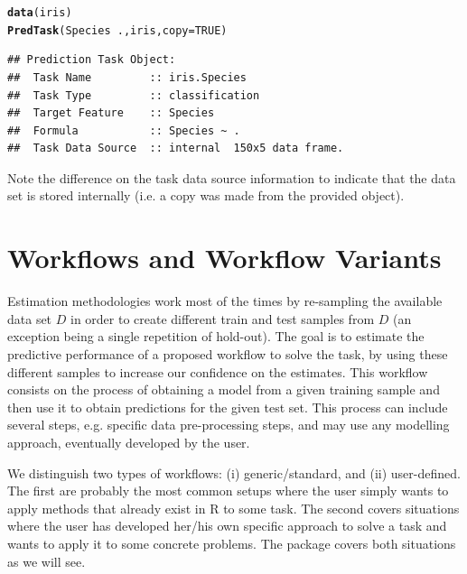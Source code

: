 \documentclass[10pt,a4paper]{article}\usepackage[]{graphicx}\usepackage[]{color}
\makeatletter
\newcommand{\hlnum}[1]{\textcolor[rgb]{0.686,0.059,0.569}{#1}}%
\newcommand{\hlopt}[1]{\textcolor[rgb]{0,0,0}{#1}}%
\newcommand{\hlstd}[1]{\textcolor[rgb]{0.345,0.345,0.345}{#1}}%
\newcommand{\hlkwc}[1]{\textcolor[rgb]{0.333,0.667,0.333}{#1}}%
\newcommand{\hlkwd}[1]{\textcolor[rgb]{0.737,0.353,0.396}{\textbf{#1}}}%
\newenvironment{kframe}{%
 \def\at@end@of@kframe{}%
 \ifinner\ifhmode%
  \def\at@end@of@kframe{\end{minipage}}%
  \begin{minipage}{\columnwidth}%
 \fi\fi%
 \def\FrameCommand##1{\hskip\@totalleftmargin \hskip-\fboxsep
 \colorbox{shadecolor}{##1}\hskip-\fboxsep
     \hskip-\linewidth \hskip-\@totalleftmargin \hskip\columnwidth}%
 \MakeFramed {\advance\hsize-\width
   \@totalleftmargin\z@ \linewidth\hsize
   \@setminipage}}%
 {\par\unskip\endMakeFramed%
 \at@end@of@kframe}
\newenvironment{knitrout}{}{} %
\makeatother
\begin{document}
\begin{knitrout}\footnotesize
{}\color{fgcolor}\begin{kframe}
\begin{alltt}
\hlkwd{data}\hlstd{(iris)}
\hlkwd{PredTask}\hlstd{(Species} \hlopt{~} \hlstd{.,iris,}\hlkwc{copy}\hlstd{=}\hlnum{TRUE}\hlstd{)}
\end{alltt}
\begin{verbatim}
## Prediction Task Object:
## 	Task Name         :: iris.Species 
## 	Task Type         :: classification 
## 	Target Feature    :: Species 
## 	Formula           :: Species ~ .
## 	Task Data Source  :: internal  150x5 data frame.
\end{verbatim}
\end{kframe}
\end{knitrout}

Note the difference on the task data source information to indicate that the data set is stored internally (i.e. a copy was made from the provided object). 

\section{Workflows and Workflow Variants}

Estimation methodologies work most of the times by re-sampling the
available data set $D$ in order to create different train and test
samples from $D$ (an exception being a single repetition of hold-out). The goal is to estimate the predictive performance
of a proposed workflow to solve the task, by using these different
samples to increase our confidence on the estimates. This workflow
consists on the process of obtaining a model from a given training
sample and then use it to obtain predictions for the given test
set. This process can include several steps, e.g. specific data
pre-processing steps, and may use any modelling approach, eventually
developed  by the user. 

We distinguish two types of workflows: (i) generic/standard, and (ii) user-defined. The first are probably the most common setups where the user simply wants to apply methods that already exist in R to some task. The second covers situations where the user has developed her/his own specific approach to solve a task and wants to apply it to some concrete problems. The package covers both situations as we will see.
\end{document}
